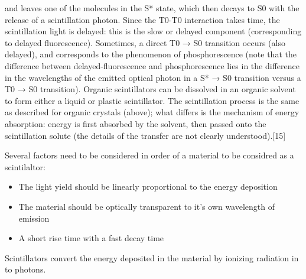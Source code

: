 and leaves one of the molecules in the S* state, which then decays to S0 with the release of a scintillation photon. Since the T0-T0 interaction takes time, the scintillation light is delayed: this is the slow or delayed component (corresponding to delayed fluorescence). Sometimes, a direct T0 → S0 transition occurs (also delayed), and corresponds to the phenomenon of phosphorescence (note that the difference between delayed-fluorescence and phosphorescence lies in the difference in the wavelengths of the emitted optical photon in a S* → S0 transition versus a T0 → S0 transition).
Organic scintillators can be dissolved in an organic solvent to form either a liquid or plastic scintillator. The scintillation process is the same as described for organic crystals (above); what differs is the mechanism of energy absorption: energy is first absorbed by the solvent, then passed onto the scintillation solute (the details of the transfer are not clearly understood).[15]

Several factors need to be considered in order of a material to be considred as a scintilaltor:
\begin{itemize}
  \item The light yield should be linearly proportional to the energy deposition
  \item The material should be optically transparent to it's own wavelength of emission
  \item A short rise time with a fast decay time
\end{itemize}
Scintillators convert the energy deposited in the material by ionizing radiation in to photons.


